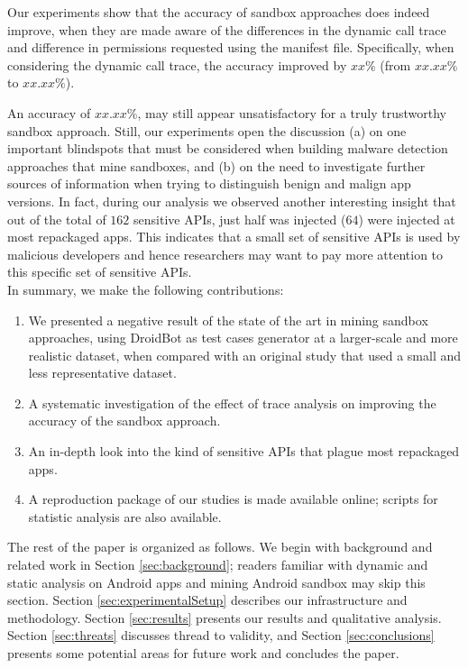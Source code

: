 Our experiments show that the accuracy of sandbox approaches does indeed improve, when they are made aware of the differences in the dynamic call trace and difference in permissions requested using the manifest file. Specifically, when considering the dynamic call trace, the accuracy improved by $xx\%$ (from $xx.xx\%$ to $xx.xx\%$). 

An accuracy of $xx.xx\%$, may still appear unsatisfactory for a truly trustworthy sandbox approach. Still, 
our experiments open the discussion (a) on one important blindspots that must be considered when building 
malware detection approaches that mine sandboxes, and (b) on the need to investigate further sources of information when trying to distinguish benign and malign app versions. 
In fact, during our analysis we observed another interesting insight that out of the total of $162$ sensitive 
APIs, just half was injected ($64$) were injected at most repackaged apps. 
This indicates that a small set of sensitive APIs is used by malicious developers and hence 
researchers may want to pay more attention to this specific set of sensitive APIs.\\


\noindent
In summary, we make the following contributions:

\begin{enumerate}[1.]
\item We presented a negative result of the state of the art in mining sandbox approaches, using DroidBot as test cases generator at a larger-scale and more realistic dataset, when compared with an original study that used a small and less representative dataset.
\item A systematic investigation of the effect of trace analysis on improving the accuracy of the sandbox approach.
\item An in-depth look into the kind of sensitive APIs that plague most repackaged apps.
\item A reproduction package of our studies is made available online; scripts for statistic analysis are also available.%
\end{enumerate}


The rest of the paper is organized as follows. We begin with background and related work in Section \ref{sec:background};
readers familiar with dynamic and static analysis on Android apps and mining Android sandbox may skip this section.
Section \ref{sec:experimentalSetup} describes our infrastructure and methodology. Section \ref{sec:results} presents our results and qualitative analysis. Section \ref{sec:threats} discusses thread to validity, and Section \ref{sec:conclusions} 
presents some potential areas for future work and concludes the paper.
